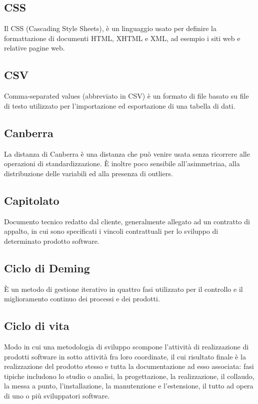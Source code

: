 \documentclass[../glossario.tex]{subfiles}
\begin{document}
\subsection*{CSS}
Il CSS (Cascading Style Sheets), è un linguaggio usato per definire la formattazione di documenti HTML, XHTML e XML, ad esempio i siti web e relative pagine web. 

\subsection*{CSV}
Comma-separated values (abbreviato in CSV) è un formato di file basato su file di testo utilizzato per l'importazione ed esportazione di una tabella di dati.

\subsection*{Canberra}
La distanza di Canberra è una distanza che può venire usata senza ricorrere alle operazioni di standardizzazione. È inoltre poco sensibile all'asimmetriaa, alla distribuzione delle variabili ed alla presenza di outliers.

\subsection*{Capitolato}
Documento tecnico redatto dal cliente, generalmente allegato ad un contratto di appalto, in cui sono specificati i vincoli contrattuali per lo sviluppo di determinato prodotto software.


\subsection*{Ciclo di Deming}
È un metodo di gestione iterativo in quattro fasi utilizzato per il controllo e il miglioramento continuo dei processi e dei prodotti.


\subsection*{Ciclo di vita}
Modo in cui una metodologia di sviluppo scompone l'attività di realizzazione di prodotti software in sotto attività fra loro coordinate, il cui risultato finale è la realizzazione del prodotto stesso e tutta la documentazione ad esso associata: fasi tipiche includono lo studio o analisi, la progettazione, la realizzazione, il collaudo, la messa a punto, l'installazione, la manutenzione e l'estensione, il tutto ad opera di uno o più sviluppatori software.
\end{document}
